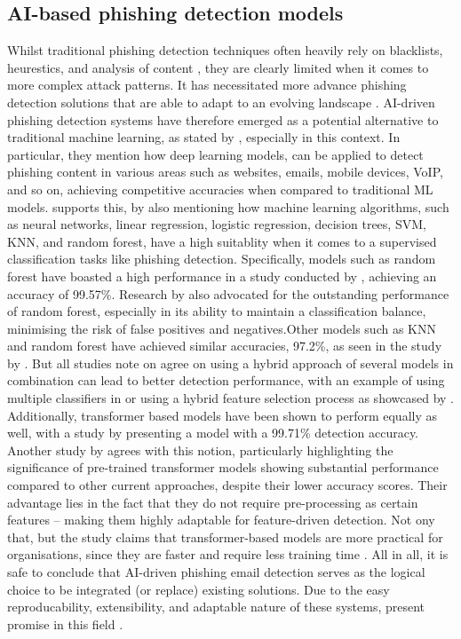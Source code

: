 
\subsection*{AI-based phishing detection models}

Whilst traditional phishing detection techniques often heavily rely on blacklists, heurestics, and analysis of content \citep{sheng2009empirical}, they are clearly limited when it comes to more complex attack patterns. It has necessitated more advance phishing detection solutions that are able to adapt to an evolving landscape \citep{andriu2023adaptive}. AI-driven phishing detection systems have therefore emerged as a potential alternative to traditional machine learning, as stated by \cite{do2022deep}, especially in this context. In particular, they mention how deep learning models, can be applied to detect phishing content in various areas such as websites, emails, mobile devices, VoIP, and so on, achieving competitive accuracies when compared to traditional ML models. \cite{tang2021survey} supports this, by also mentioning how machine learning algorithms, such as neural networks, linear regression, logistic regression, decision trees, SVM, KNN, and random forest, have a high suitablity when it comes to a supervised classification tasks like phishing detection. Specifically, models such as random forest have boasted a high performance in a study conducted by \cite{gupta2021novel}, achieving an accuracy of 99.57\%. Research by \citep{kapoor2024comparative} also advocated for the outstanding performance of random forest, especially in its ability to maintain a classification balance, minimising the risk of false positives and negatives.Other models such as KNN and random forest have achieved similar accuracies, 97.2\%, as seen in the study by \cite{zamir2020phishing}. But all studies note on agree on using a hybrid approach of several models in combination can lead to better detection performance, with an example of using multiple classifiers in \cite{alsariera2020ai} or using a hybrid feature selection process as showcased by \cite{hamid2013using}. Additionally, transformer based models have been shown to perform equally as well, with a study by \cite{do2024integrated} presenting a model with a 99.71\% detection accuracy. Another study by \cite{shirazi2022towards} agrees with this notion, particularly highlighting the significance of pre-trained transformer models showing substantial performance compared to other current approaches, despite their lower accuracy scores. Their advantage lies in the fact that they do not require pre-processing as certain features -- making them highly adaptable for feature-driven detection. Not ony that, but the study claims that transformer-based models are more practical for organisations, since they are faster and require less training time \citep{shirazi2022towards}. All in all, it is safe to conclude that AI-driven phishing email detection serves as the logical choice to be integrated (or replace) existing solutions. Due to the easy reproducability, extensibility, and adaptable nature of these systems, present promise in this field \citep{bauskar2024ai}.

